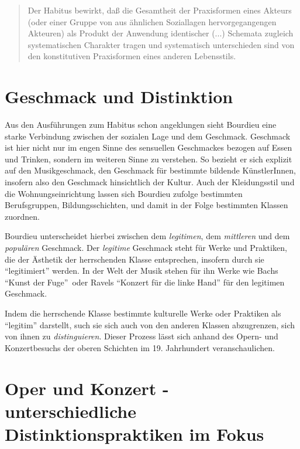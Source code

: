 \documentclass[a4paper, german, oneside]{scrbook}
\begin{document}
\blockquote[{\cite[278]{bourdieu_feinen_2012}}]{Der Habitus bewirkt, daß die Gesamtheit der Praxisformen eines Akteurs (oder einer Gruppe von aus ähnlichen Soziallagen hervorgegangengen Akteuren) als Produkt der Anwendung identischer (...) Schemata zugleich systematischen Charakter tragen und systematisch unterschieden sind von den konstitutiven Praxisformen eines anderen Lebensstils.}

\section{Geschmack und Distinktion}
Aus den Ausführungen zum Habitus schon angeklungen sieht Bourdieu eine starke Verbindung zwischen der sozialen Lage und dem Geschmack. Geschmack ist hier nicht nur im engen Sinne des sensuellen Geschmackes bezogen auf Essen und Trinken, sondern im weiteren Sinne zu verstehen. So bezieht er sich explizit auf den Musikgeschmack, den Geschmack für bestimmte bildende KünstlerInnen, insofern also den Geschmack hinsichtlich der Kultur. Auch der Kleidungsstil und die Wohnungseinrichtung lassen sich Bourdieu zufolge bestimmten Berufsgruppen, Bildungsschichten, und damit in der Folge bestimmten Klassen zuordnen. \parencite[vgl.][25]{bourdieu_feinen_2012}

Bourdieu unterscheidet hierbei zwischen dem \emph{legitimen}, dem \emph{mittleren} und dem \emph{populären} Geschmack. Der \emph{legitime} Geschmack steht für Werke und Praktiken, die der Ästhetik der herrschenden Klasse entsprechen, insofern durch sie \enquote{legitimiert} werden. \parencite[vgl.][551]{joas_sozialtheorie:_2004} In der Welt der Musik stehen für ihn Werke wie Bachs \enquote{Kunst der Fuge} oder Ravels \enquote{Konzert für die linke Hand} für den legitimen Geschmack.

Indem die herrschende Klasse bestimmte kulturelle Werke oder Praktiken als \enquote{legitim} darstellt, such sie sich auch von den anderen Klassen abzugrenzen, sich von ihnen zu \emph{distinguieren}. Dieser Prozess lässt sich anhand des Opern- und Konzertbesuchs der oberen Schichten im 19. Jahrhundert veranschaulichen.


\section{Oper und Konzert - unterschiedliche Distinktionspraktiken im Fokus}
\label{operUndKonzert}
\end{document}
